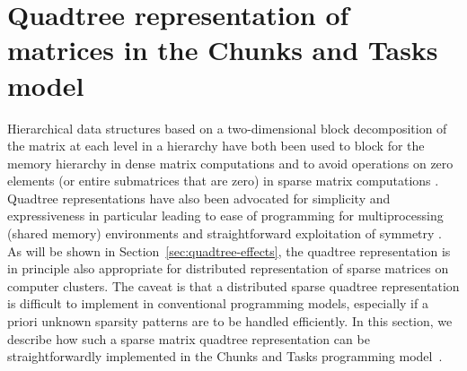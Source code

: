 \documentclass{elsarticle}
\begin{document}
\section{Quadtree representation of matrices in the Chunks and Tasks model}\label{sec:chtml}
Hierarchical data structures based on a two-dimensional block
decomposition of the matrix at each level in a hierarchy have both
been used to block for the memory hierarchy in dense matrix
computations \cite{ChatterjeeMatMul2002_A, FrensMatMul1997_B,
  recursive_dense2004} and to avoid operations on zero elements (or
entire submatrices that are zero) in sparse matrix computations
\cite{quadtreeWise1984}.
Quadtree representations have also been advocated for
simplicity and expressiveness in particular leading
to
ease of programming for multiprocessing (shared memory) environments
\cite{Dinh_1999, lugowski2014, m-rrs, quadtreeWise1984,
  ChatterjeeMatMul2002_A, FrensMatMul1997_B} and straightforward
exploitation of symmetry \cite{m-rrs}.
As will be shown in Section~\ref{sec:quadtree-effects}, the quadtree
representation is in principle also appropriate for distributed
representation of sparse matrices on computer clusters. The caveat is
that a distributed sparse quadtree representation is difficult to
implement in conventional programming models, especially if a priori
unknown sparsity patterns are to be handled efficiently.  In this
section, we describe how such a sparse matrix quadtree representation
can be straightforwardly implemented in the Chunks and Tasks
programming model~\cite{chunks-and-tasks}.
\end{document}
